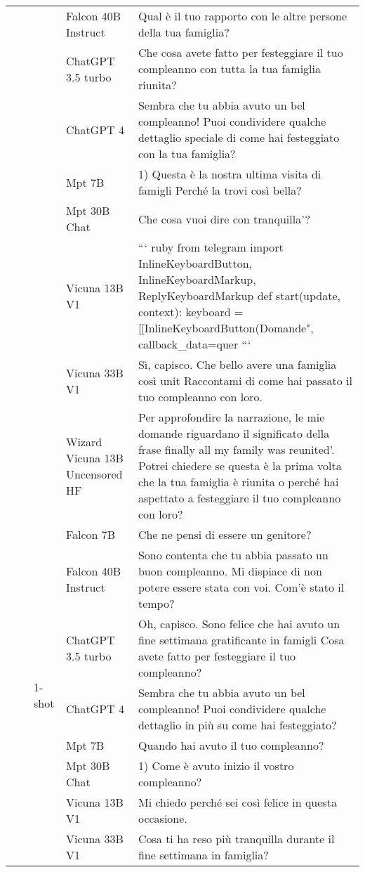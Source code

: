 \begin{center}
\begin{longtable}{l|l|l|p{3cm}|p{8cm}}
 &  &  & Falcon 40B Instruct & Qual è il tuo rapporto con le altre persone della tua famiglia? \\
 &  &  & ChatGPT 3.5 turbo & Che cosa avete fatto per festeggiare il tuo compleanno con tutta la tua famiglia riunita? \\
 &  &  & ChatGPT 4 & Sembra che tu abbia avuto un bel compleanno! Puoi condividere qualche dettaglio speciale di come hai festeggiato con la tua famiglia? \\
 &  &  & Mpt 7B & 1) Questa è la nostra ultima visita di famigli Perché la trovi così bella? \\
 &  &  & Mpt 30B Chat &  Che cosa vuoi dire con tranquilla'? \\
 &  &  & Vicuna 13B V1 & ``` ruby from telegram import InlineKeyboardButton, InlineKeyboardMarkup, ReplyKeyboardMarkup def start(update, context): keyboard = [[InlineKeyboardButton(Domande", callback_data=quer ``` \\
 &  &  & Vicuna 33B V1 & Sì, capisco. Che bello avere una famiglia così unit Raccontami di come hai passato il tuo compleanno con loro. \\
 &  &  & Wizard Vicuna 13B Uncensored HF & Per approfondire la narrazione, le mie domande riguardano il significato della frase finally all my family was reunited'. Potrei chiedere se questa è la prima volta che la tua famiglia è riunita o perché hai aspettato a festeggiare il tuo compleanno con loro? \\
\cline{3-5}
 &  & \multirow[c]{9}{*}{1-shot} & Falcon 7B & Che ne pensi di essere un genitore? \\
 &  &  & Falcon 40B Instruct & Sono contenta che tu abbia passato un buon compleanno. Mi dispiace di non potere essere stata con voi. Com'è stato il tempo? \\
 &  &  & ChatGPT 3.5 turbo & Oh, capisco. Sono felice che hai avuto un fine settimana gratificante in famigli Cosa avete fatto per festeggiare il tuo compleanno? \\
 &  &  & ChatGPT 4 & Sembra che tu abbia avuto un bel compleanno! Puoi condividere qualche dettaglio in più su come hai festeggiato? \\
 &  &  & Mpt 7B & Quando hai avuto il tuo compleanno? \\
 &  &  & Mpt 30B Chat & 1) Come è avuto inizio il vostro compleanno? \\
 &  &  & Vicuna 13B V1 & Mi chiedo perché sei così felice in questa occasione. \\
 &  &  & Vicuna 33B V1 & Cosa ti ha reso più tranquilla durante il fine settimana in famiglia? \\

\end{longtable}
\end{center}
